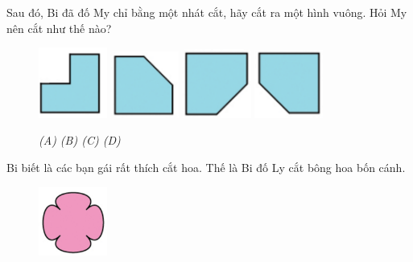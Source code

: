 Sau đó, Bi đã đố My chỉ bằng một nhát cắt, hãy cắt ra một hình vuông. Hỏi My nên cắt như thế nào?
\begin{figure}[H]
	\vspace*{-5pt}
	\centering
	\captionsetup{labelformat=empty}
	\captionsetup{justification=centering}
	\includegraphics[width =0.2\textwidth]{cat-10a}
	\hfill
	\includegraphics[width =0.2\textwidth]{cat-10b}
	\hfill
	\includegraphics[width =0.2\textwidth]{cat-10c}
	\hfill
	\includegraphics[width =0.2\textwidth]{cat-10d}	
	\vspace*{-5pt}
	\caption{\small \it (A)\hspace*{40pt} (B)\hspace*{65pt} (C) \hspace*{40pt} (D)}
	\vspace*{-10pt}
\end{figure}
\begin{multicols}{2}
	Bi biết là các bạn gái rất thích cắt hoa. Thế là Bi đố Ly cắt bông hoa bốn cánh.
	
	\columnbreak
	\begin{figure}[H]
		\vspace*{-5pt}
		\captionsetup{labelformat=empty}
		\centering
		\captionsetup{justification=raggedleft}
		\includegraphics[width =0.2\textwidth]{cat-11}
		\vspace*{-10pt}
	\end{figure}
\end{multicols}
